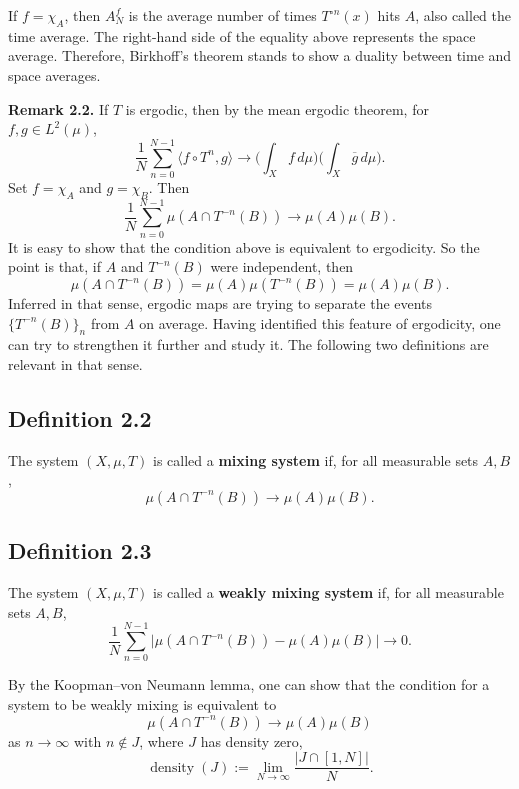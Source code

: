 \documentclass[11pt,a4paper]{article}
\begin{document}
If $f=\chi_A$, then $A_N^f$ is the average number of times $T^{\circ n}(x)$
hits $A$, also called the time average. The right-hand side of the equality
above represents the space average. Therefore, Birkhoff's theorem stands to
show a duality between time and space averages.

\textbf{Remark 2.2.} If $T$ is ergodic, then by the mean ergodic theorem, for $f,g\in L^2(\mu)$,
\[
\frac1N\sum_{n=0}^{N-1}\langle f\circ T^n,g\rangle
\longrightarrow
\Bigg(\int_Xf\,d\mu\Bigg)
\Bigg(\int_X\overline g\,d\mu\Bigg).
\]
Set $f=\chi_A$ and $g=\chi_B$. Then
\[
\frac1N\sum_{n=0}^{N-1}\mu(A\cap T^{-n}(B))
\longrightarrow\mu(A)\mu(B).
\]
It is easy to show that the condition above is equivalent to ergodicity. So the point is that, if $A$ and $T^{-n}(B)$ were independent, then
\[
\mu(A\cap T^{-n}(B))
=\mu(A)\mu(T^{-n}(B))
=\mu(A)\mu(B).
\]
Inferred in that sense, ergodic maps are trying to separate the events $\{T^{-n}(B)\}_n$ from $A$ on average. Having identified this feature of ergodicity, one can try to strengthen it further and study it. The following two definitions are relevant in that sense.

\subsection*{Definition 2.2}
The system $(X,\mu,T)$ is called a \textbf{mixing system} if, for all measurable sets $A,B$,
\[
\mu(A\cap T^{-n}(B))\longrightarrow\mu(A)\mu(B).
\]

\subsection*{Definition 2.3}
The system $(X,\mu,T)$ is called a \textbf{weakly mixing system} if, for all measurable sets $A,B$,
\[
\frac1N\sum_{n=0}^{N-1}
\big|\mu(A\cap T^{-n}(B))-\mu(A)\mu(B)\big|
\longrightarrow0.
\]

By the Koopman--von Neumann lemma, one can show that the condition for a system to be weakly mixing is equivalent to
\[
\mu(A\cap T^{-n}(B))\longrightarrow\mu(A)\mu(B)
\]
as $n\to\infty$ with $n\notin J$, where $J$ has density zero,
\[
\operatorname{density}(J)
:=\lim_{N\to\infty}\frac{|J\cap[1,N]|}{N}.
\]
\end{document}

